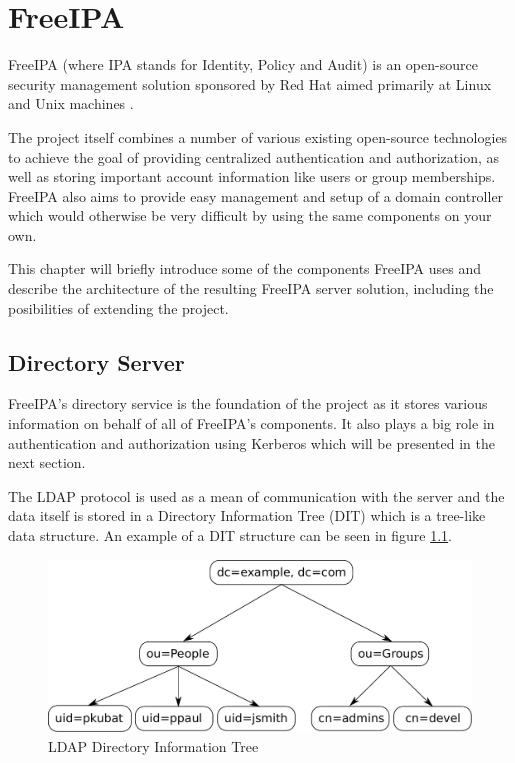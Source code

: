 \chapter{FreeIPA}
\label{chp:freeipa}

FreeIPA (where IPA stands for Identity, Policy and Audit) is an open-source security management solution sponsored by Red Hat aimed primarily at Linux and Unix machines \cite{ipaWeb}.

The project itself combines a number of various existing open-source technologies to achieve the goal of providing centralized authentication and authorization, as well as storing important account information like users or group memberships.
FreeIPA also aims to provide easy management and setup of a domain controller which would otherwise be very difficult by using the same components on your own.

This chapter will briefly introduce some of the components FreeIPA uses and describe the architecture of the resulting FreeIPA server solution, including the posibilities of extending the project.

\section{Directory Server}
FreeIPA's directory service is the foundation of the project as it stores various information on behalf of all of FreeIPA's components.
It also plays a big role in authentication and authorization using Kerberos which will be presented in the next section.

The LDAP protocol \cite{ldapRFC} is used as a mean of communication with the server and the data itself is stored in a Directory Information Tree (DIT) which is a tree-like data structure.
An example of a DIT structure can be seen in figure \ref{fig:dit}.

\begin{figure}[!ht]
    \centering
        \includegraphics[scale=0.6]{fig/ldap-dit}
    \caption{LDAP Directory Information Tree}
    \label{fig:dit}
\end{figure}

